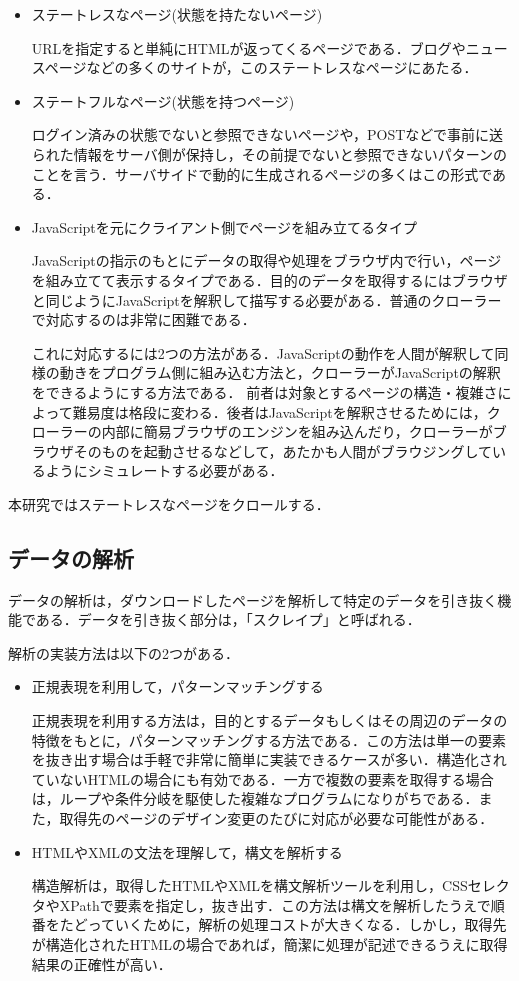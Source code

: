 \begin{itemize}
  \item ステートレスなページ(状態を持たないページ)

URLを指定すると単純にHTMLが返ってくるページである．ブログやニュースページなどの多くのサイトが，このステートレスなページにあたる．
  \item ステートフルなページ(状態を持つページ)

ログイン済みの状態でないと参照できないページや，POSTなどで事前に送られた情報をサーバ側が保持し，その前提でないと参照できないパターンのことを言う．サーバサイドで動的に生成されるページの多くはこの形式である．
  \item JavaScriptを元にクライアント側でページを組み立てるタイプ

JavaScriptの指示のもとにデータの取得や処理をブラウザ内で行い，ページを組み立てて表示するタイプである．目的のデータを取得するにはブラウザと同じようにJavaScriptを解釈して描写する必要がある．普通のクローラーで対応するのは非常に困難である．

これに対応するには2つの方法がある．JavaScriptの動作を人間が解釈して同様の動きをプログラム側に組み込む方法と，クローラーがJavaScriptの解釈をできるようにする方法である．
前者は対象とするページの構造・複雑さによって難易度は格段に変わる．後者はJavaScriptを解釈させるためには，クローラーの内部に簡易ブラウザのエンジンを組み込んだり，クローラーがブラウザそのものを起動させるなどして，あたかも人間がブラウジングしているようにシミュレートする必要がある\cite{miyake}．


\end{itemize}


本研究ではステートレスなページをクロールする．


\subsection{データの解析}

データの解析は，ダウンロードしたページを解析して特定のデータを引き抜く機能である．データを引き抜く部分は，「スクレイプ」と呼ばれる．

解析の実装方法は以下の2つがある．

\begin{itemize}
  \item 正規表現を利用して，パターンマッチングする

正規表現を利用する方法は，目的とするデータもしくはその周辺のデータの特徴をもとに，パターンマッチングする方法である．この方法は単一の要素を抜き出す場合は手軽で非常に簡単に実装できるケースが多い．構造化されていないHTMLの場合にも有効である．一方で複数の要素を取得する場合は，ループや条件分岐を駆使した複雑なプログラムになりがちである．また，取得先のページのデザイン変更のたびに対応が必要な可能性がある．
  \item HTMLやXMLの文法を理解して，構文を解析する

構造解析は，取得したHTMLやXMLを構文解析ツールを利用し，CSSセレクタやXPathで要素を指定し，抜き出す．この方法は構文を解析したうえで順番をたどっていくために，解析の処理コストが大きくなる．しかし，取得先が構造化されたHTMLの場合であれば，簡潔に処理が記述できるうえに取得結果の正確性が高い\cite{miyake}．
\end{itemize}

